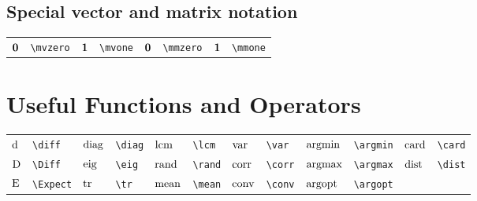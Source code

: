 \documentclass{article}
\begin{document}
\subsection{Special vector and matrix notation}
\begin{tabular}{*{8}{l}}
${\bm 0}$ & \lstinline`\mvzero` & ${\bm 1}$ & \lstinline`\mvone` & ${\mathbf 0}$ & \lstinline`\mmzero` & ${\mathbf 1}$ & \lstinline`\mmone` \\
\end{tabular}


\section{Useful Functions and Operators}
\begin{tabular}{*{12}{l}}
$\operatorname{d\!}$ & \lstinline`\diff` & $\operatorname{diag}$ & \lstinline`\diag` & $\operatorname{lcm}$ & \lstinline`\lcm` & $\operatorname{var}$ & \lstinline`\var` & $\operatorname*{argmin}$ & \lstinline`\argmin` & $\operatorname{card}$ & \lstinline`\card`\\
$\operatorname{D}$ & \lstinline`\Diff` & $\operatorname{eig}$ & \lstinline`\eig` & $\operatorname{rand}$ & \lstinline`\rand` & $\operatorname{corr}$ & \lstinline`\corr` & $\operatorname*{argmax}$ & \lstinline`\argmax` & $\operatorname*{dist}$ & \lstinline`\dist`\\
$\operatorname{E}$ & \lstinline`\Expect` & $\operatorname{tr}$ & \lstinline`\tr` & $\operatorname{mean}$ & \lstinline`\mean` & $\operatorname{conv}$ & \lstinline`\conv` & $\operatorname*{argopt}$ & \lstinline`\argopt` & \\
\end{tabular}
\end{document}
